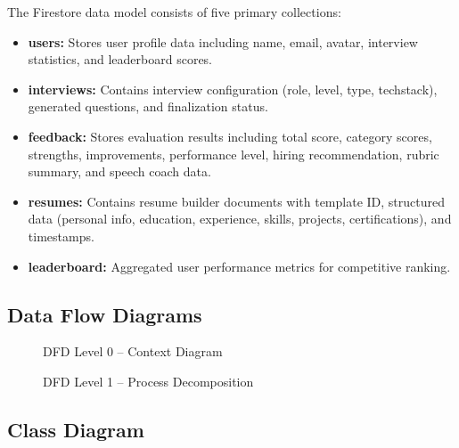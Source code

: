 \documentclass[12pt,a4paper,oneside]{report}
\begin{document}
The Firestore data model consists of five primary collections:

\begin{itemize}
  \item \textbf{users:} Stores user profile data including name, email, avatar, interview statistics, and leaderboard scores.
  \item \textbf{interviews:} Contains interview configuration (role, level, type, techstack), generated questions, and finalization status.
  \item \textbf{feedback:} Stores evaluation results including total score, category scores, strengths, improvements, performance level, hiring recommendation, rubric summary, and speech coach data.
  \item \textbf{resumes:} Contains resume builder documents with template ID, structured data (personal info, education, experience, skills, projects, certifications), and timestamps.
  \item \textbf{leaderboard:} Aggregated user performance metrics for competitive ranking.
\end{itemize}

\subsection{Data Flow Diagrams}

\begin{figure}[H]
\centering
{}
\caption{DFD Level 0 -- Context Diagram}
\label{fig:dfd_level0}
\end{figure}

\begin{figure}[H]
\centering
{}
\caption{DFD Level 1 -- Process Decomposition}
\label{fig:dfd_level1}
\end{figure}

\subsection{Class Diagram}
\end{document}
